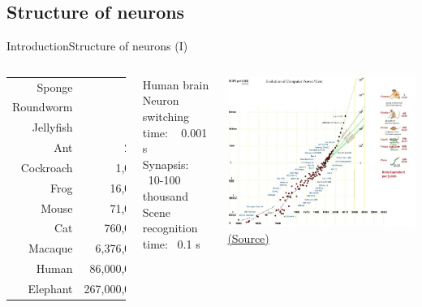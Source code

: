 \documentclass[10pt,compress]{beamer} %
\begin{document}
\subsection{Structure of neurons}
\begin{frame}{Introduction}{Structure of neurons (I)}
    \vspace{-0.3cm}
    \begin{columns}
		\begin{tabular}{r|r}\hline
		\sc{Animal} & \sc{Neurons} \\\hline
		Sponge & 0 \\
		Roundworm & 302 \\
		Jellyfish & 800 \\
		Ant & 250,000 \\
		Cockroach & 1,000,000 \\
		Frog & 16,000,000 \\
		Mouse & 71,000,000 \\
		Cat & 760,000,000 \\
		Macaque & 6,376,000,000 \\
		Human & 86,000,000,000 \\
		Elephant & 267,000,000,000 \\\hline
		\end{tabular}

	   \begin{block}{Human brain}
		Neuron switching time: ~ 0.001 s\\
  		Synapsis: ~10-100 thousand\\
   		Scene recognition time: ~0.1 s
	\end{block}

    \begin{center}
	        \includegraphics[width=0.9\linewidth]{figs/power.jpg}\\
	        \tiny{\href{http://www.sjef.nu/a-basic-introduction-to-singularity-skepticism/}{(Source)}}
	\end{center}
    \end{columns}
\end{frame}
\end{document}
